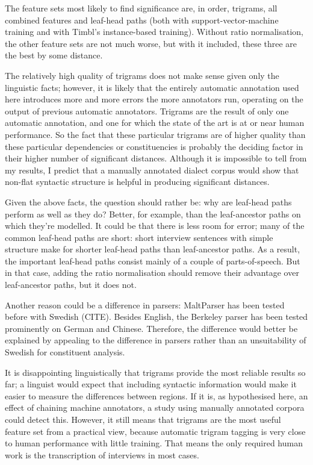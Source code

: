 
The feature sets most likely to find significance are, in order,
trigrams, all combined features and leaf-head paths (both with
support-vector-machine training and with Timbl's instance-based
training). Without ratio normalisation, the other feature sets are not
much worse, but with it included, these three are the best by some
distance.

The relatively high quality of trigrams does not make sense given only
the linguistic facts; however, it is likely that the entirely
automatic annotation used here introduces more and more errors the
more annotators run, operating on the output of previous automatic
annotators. Trigrams are the result of only one
automatic annotation, and one for which the state of the art is at or
near human performance. So the fact that these particular trigrams are
of higher quality than these particular dependencies or constituencies
is probably the deciding factor in their higher number of significant
distances. Although it is impossible to tell from my results, I
predict that a manually annotated dialect corpus would show that
non-flat syntactic structure is helpful in producing significant
distances.

Given the above facts, the question should rather be: why are
leaf-head paths perform as well as they do? Better, for example, than
the leaf-ancestor paths on which they're modelled. It could be that
there is less room for error; many of the common leaf-head paths are
short: short interview sentences with simple structure make for
shorter leaf-head paths than leaf-ancestor paths. As a result, the
important leaf-head paths consist mainly of a couple of
parts-of-speech. But in that case, adding the ratio normalisation
should remove their advantage over leaf-ancestor paths, but it does
not.

Another reason could be a difference in parsers: MaltParser has been
tested before with Swedish (CITE). Besides English, the Berkeley
parser has been tested prominently on German and Chinese. Therefore,
the difference would better be explained by appealing to the
difference in parsers rather than an unsuitability of Swedish for
constituent analysis.

It is disappointing linguistically that trigrams provide the most
reliable results so far; a linguist would expect that including
syntactic information would make it easier to measure the differences
between regions. If it is, as hypothesised here, an effect of chaining
machine annotators, a study using manually annotated corpora could
detect this. However, it still means that trigrams are the most useful
feature set from a practical view, because automatic trigram tagging
is very close to human performance with little training. That means
the only required human work is the transcription of interviews in
most cases.

